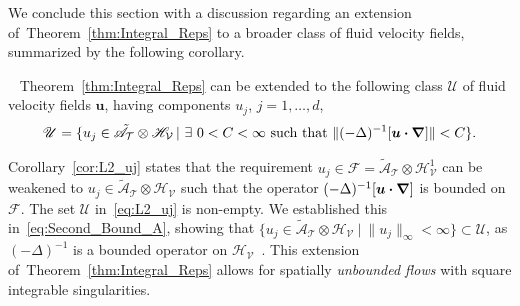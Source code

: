 \documentclass[leqno,onefignum,onetabnum]{siamltex1213}
\newcommand{\thmref}[1]{Theorem~\ref{#1}}
\newcommand{\corref}[1]{Corollary~\ref{#1}}
\newcommand{\Tc}{\mathcal{T}}
\newcommand{\Vc}{\mathcal{V}}
\newcommand{\Hs}{\mathscr{H}}
\newcommand{\As}{\mathscr{A}}
\newcommand{\Fs}{\mathscr{F}}
\newcommand\bnabla{\mbox{\boldmath${\nabla}$}}
\providecommand\bcdot{\boldsymbol{\cdot}}
\newcommand{\vecu}{\boldsymbol{u}}
\begin{document}
We conclude this section with a discussion regarding an extension
of~\thmref{thm:Integral_Reps} to a broader class of 
fluid velocity fields, summarized by the following corollary.
%
\begin{corollary}~\label{cor:L2_uj}
  \thmref{thm:Integral_Reps} can be extended to the
  following class $\mathscr{U}$ of fluid velocity fields $\vecu$,
  having components $u_j$, $j=1,\ldots,d$,
  \begin{align}\label{eq:L2_uj}
    \mathscr{U}
    =\{u_j\in\tilde{\As}_{\Tc}\otimes\Hs_{\Vc} \,|\ \exists \ 0<C<\infty \text{ such that }
                                \|(-\Delta)^{-1}[\vecu\bcdot\bnabla]\|<C\}.
  \end{align}
\end{corollary}
%
\corref{cor:L2_uj} states that the requirement
$u_j\in\Fs=\tilde{\As}_{\Tc}\otimes\Hs^1_{\Vc}$ can be weakened to
$u_j\in\tilde{\As}_{\Tc}\otimes\Hs_{\Vc}$ such that the operator
$(-\Delta)^{-1}[\vecu\bcdot\bnabla]$ is bounded on $\Fs$. The set
$\mathscr{U}$ in~\eqref{eq:L2_uj} is non-empty. We established this
in~\eqref{eq:Second_Bound_A}, showing that  
$\{u_j\in\tilde{\As}_{\Tc}\otimes\Hs_{\Vc} \ |\ \|u_j\|_{\infty}<\infty\}\subset\mathscr{U}$, as
$(-\Delta)^{-1}$ is a bounded operator on
$\Hs_{\Vc}$~\cite{Stakgold:BVP:2000}. This extension
of~\thmref{thm:Integral_Reps} allows for spatially \emph{unbounded
  flows} with square integrable singularities. 
\end{document}
